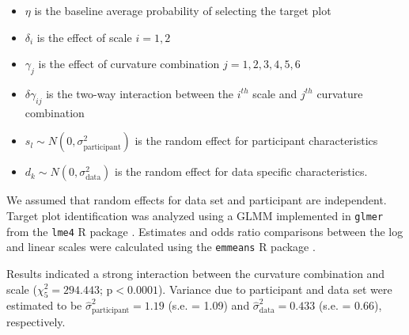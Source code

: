 \documentclass[12pt]{article}
\begin{document}
\begin{itemize}
\item $\eta$ is the baseline average probability of selecting the target plot
\item $\delta_i$ is the effect of scale $i = 1,2$
\item $\gamma_j$ is the effect of curvature combination $j = 1,2,3,4,5,6$
\item $\delta\gamma_{ij}$ is the two-way interaction between the $i^{th}$ scale and $j^{th}$ curvature combination
\item $s_l \sim N(0,\sigma^2_\text{participant})$ is the random effect for participant characteristics
\item $d_k \sim N(0,\sigma^2_{\text{data}})$ is the random effect for data specific characteristics. 
\end{itemize}

\noindent We assumed that random effects for data set and participant
are independent. Target plot identification was analyzed using a GLMM
implemented in \texttt{glmer} from the \texttt{lme4} R package
\citep{lme4}. Estimates and odds ratio comparisons between the log and
linear scales were calculated using the \texttt{emmeans} R package
\citep{emmeans}.

Results indicated a strong interaction between the curvature combination
and scale (\(\chi^2_5 = 294.443\); \(\text{p} <0.0001\)). Variance due
to participant and data set were estimated to be
\(\hat\sigma^2_{\text{participant}} = 1.19\) (s.e. = 1.09) and
\(\hat\sigma^2_{\text{data}} = 0.433\) (s.e. = 0.66), respectively.
\end{document}

